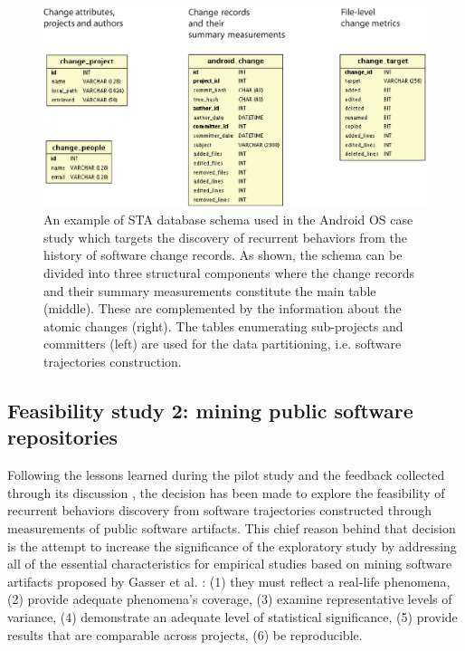 \begin{figure}[t]
   \centering
   \includegraphics[width=150mm]{figures/sta-schema.eps}
   \caption{An example of STA database schema used in the Android OS case study which targets the discovery of
   recurrent behaviors from the history of software change records. As shown, the schema can be divided into three 
   structural components where the change records and their summary measurements constitute the main table (middle).
   These are complemented by the information about the atomic changes (right). 
   The tables enumerating sub-projects and committers (left) are used for the data partitioning, i.e. software trajectories construction.}
   \label{fig:db-schema}
\end{figure}

\subsection{Feasibility study 2: mining public software repositories} \label{feasibility2}
Following the lessons learned during the pilot study and the feedback collected through its discussion \cite{csdl2-10-09}, 
the decision has been made to explore the feasibility of recurrent behaviors discovery from software trajectories constructed 
through measurements of public software artifacts. This chief reason behind that decision is the attempt to increase 
the significance of the exploratory study by addressing all of the essential characteristics for empirical studies based on mining 
software artifacts proposed by Gasser et al. \cite{citeulike:13058334}:  
(1) they must reflect a real-life phenomena, 
(2) provide adequate phenomena's coverage, 
(3) examine representative levels of variance, 
(4) demonstrate an adequate level of statistical significance,
(5) provide results that are comparable across projects,
(6) be reproducible. 

